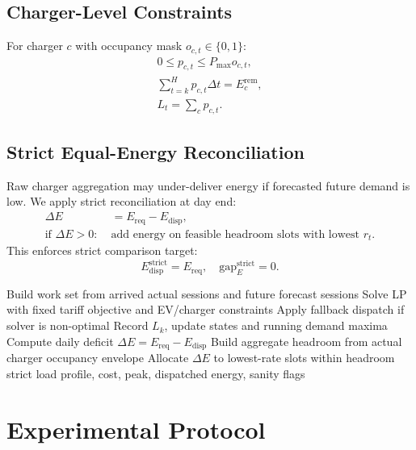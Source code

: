 \documentclass[journal]{IEEEtran}
\begin{document}
\subsection{Charger-Level Constraints}
For charger $c$ with occupancy mask $o_{c,t}\in\{0,1\}$:
\begin{align}
0\le p_{c,t}\le P_{\max}o_{c,t},\\
\sum_{t=k}^{H} p_{c,t}\Delta t = E_c^{\mathrm{rem}},\\
L_t=\sum_c p_{c,t}.
\end{align}

\subsection{Strict Equal-Energy Reconciliation}
Raw charger aggregation may under-deliver energy if forecasted future demand is low. We apply strict reconciliation at day end:
\begin{align}
\Delta E &= E_{\mathrm{req}}-E_{\mathrm{disp}},\\
\text{if }\Delta E>0: \;&\text{add energy on feasible headroom slots with lowest }r_t.
\end{align}
This enforces strict comparison target:
\begin{equation}
E_{\mathrm{disp}}^{\mathrm{strict}}=E_{\mathrm{req}},\quad \mathrm{gap}_E^{\mathrm{strict}}=0.
\end{equation}

\begin{algorithm}[t]
\caption{Rolling MPC With Strict Charger Reconciliation}
\begin{algorithmic}[1]
    \State Build work set from arrived actual sessions and future forecast sessions
    \State Solve LP with fixed tariff objective and EV/charger constraints
    \State Apply fallback dispatch if solver is non-optimal
    \State Record $L_k$, update states and running demand maxima
\EndFor
{}
    \State Compute daily deficit $\Delta E=E_{\mathrm{req}}-E_{\mathrm{disp}}$
    \State Build aggregate headroom from actual charger occupancy envelope
    \State Allocate $\Delta E$ to lowest-rate slots within headroom
\EndIf
\State \Return strict load profile, cost, peak, dispatched energy, sanity flags
\end{algorithmic}
\end{algorithm}

\section{Experimental Protocol}
\end{document}
